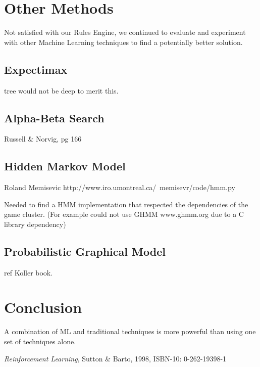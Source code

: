 \documentclass[11pt, oneside]{article}   	%
\begin{document}
\section{Other Methods}

Not satisfied with our Rules Engine, we continued to evaluate and experiment with other Machine Learning techniques to find a potentially better solution.

\subsection{Expectimax}
tree would not be deep to merit this. 

\subsection{Alpha-Beta Search}
Russell \& Norvig, pg 166

\subsection{Hidden Markov Model}
 Roland Memisevic
 http://www.iro.umontreal.ca/~memisevr/code/hmm.py

Needed to find a HMM implementation that respected the dependencies of the game cluster. (For example could not use GHMM www.ghmm.org due to a C library dependency)

\subsection{Probabilistic Graphical Model}

ref Koller book.

\section{Conclusion}
A combination of ML and traditional techniques is more powerful than using one set of techniques alone.

\begin{thebibliography}{1}

 \emph{Reinforcement Learning}, Sutton \& Barto, 1998, ISBN-10: 0-262-19398-1
 
  \end{thebibliography}
\end{document}
